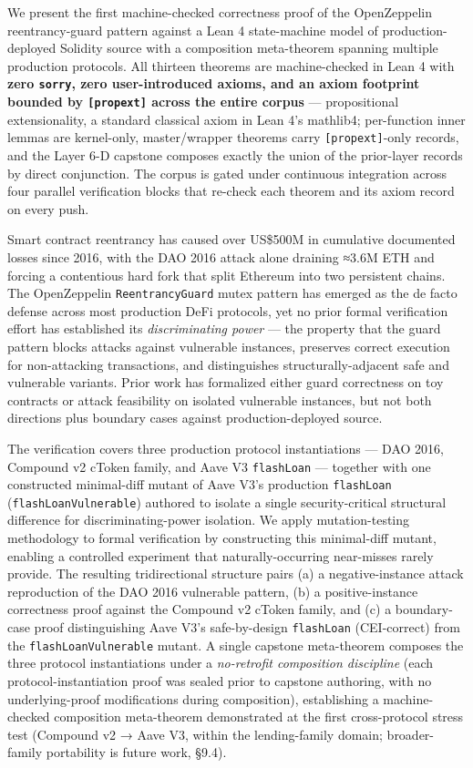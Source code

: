 We present the first machine-checked correctness proof of the
OpenZeppelin reentrancy-guard pattern against a Lean 4 state-machine
model of production-deployed Solidity source with a composition
meta-theorem spanning multiple production protocols. All thirteen
theorems are machine-checked in Lean 4 with \textbf{zero \texttt{sorry},
zero user-introduced axioms, and an axiom footprint bounded by
\texttt{{[}propext{]}} across the entire corpus} --- propositional
extensionality, a standard classical axiom in Lean 4's mathlib4;
per-function inner lemmas are kernel-only, master/wrapper theorems carry
\texttt{{[}propext{]}}-only records, and the Layer 6-D capstone composes
exactly the union of the prior-layer records by direct conjunction. The
corpus is gated under continuous integration across four parallel
verification blocks that re-check each theorem and its axiom record on
every push.

Smart contract reentrancy has caused over US\$500M in cumulative
documented losses since 2016, with the DAO 2016 attack alone draining
≈3.6M ETH and forcing a contentious hard fork that split Ethereum into
two persistent chains. The OpenZeppelin \texttt{ReentrancyGuard} mutex
pattern has emerged as the de facto defense across most production DeFi
protocols, yet no prior formal verification effort has established its
\emph{discriminating power} --- the property that the guard pattern
blocks attacks against vulnerable instances, preserves correct execution
for non-attacking transactions, and distinguishes structurally-adjacent
safe and vulnerable variants. Prior work has formalized either guard
correctness on toy contracts or attack feasibility on isolated
vulnerable instances, but not both directions plus boundary cases
against production-deployed source.

The verification covers three production protocol instantiations --- DAO
2016, Compound v2 cToken family, and Aave V3 \texttt{flashLoan} ---
together with one constructed minimal-diff mutant of Aave V3's
production \texttt{flashLoan} (\texttt{flashLoanVulnerable}) authored to
isolate a single security-critical structural difference for
discriminating-power isolation. We apply mutation-testing methodology to
formal verification by constructing this minimal-diff mutant, enabling a
controlled experiment that naturally-occurring near-misses rarely
provide. The resulting tridirectional structure pairs (a) a
negative-instance attack reproduction of the DAO 2016 vulnerable
pattern, (b) a positive-instance correctness proof against the Compound
v2 cToken family, and (c) a boundary-case proof distinguishing Aave V3's
safe-by-design \texttt{flashLoan} (CEI-correct) from the
\texttt{flashLoanVulnerable} mutant. A single capstone meta-theorem
composes the three protocol instantiations under a \emph{no-retrofit
composition discipline} (each protocol-instantiation proof was sealed
prior to capstone authoring, with no underlying-proof modifications
during composition), establishing a machine-checked composition
meta-theorem demonstrated at the first cross-protocol stress test
(Compound v2 → Aave V3, within the lending-family domain; broader-family
portability is future work, §9.4).

